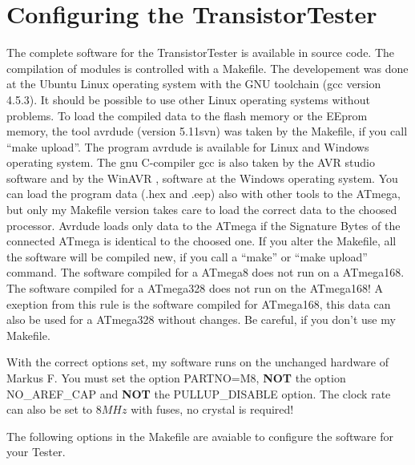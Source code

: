\chapter{Configuring the TransistorTester}
\label{sec:config}
The complete software for the TransistorTester is available in source code.
The compilation of modules is controlled with a Makefile. The developement was done
at the Ubuntu Linux operating system with the GNU toolchain (gcc version 4.5.3).
It should be possible to use other Linux operating systems without problems.
To load the compiled data to the flash memory or
the EEprom memory, the tool avrdude (version 5.11svn) was taken by the Makefile, if you call ``make upload''.
 The program avrdude \cite{avrdude} is available for Linux and Windows operating system.
The gnu C-compiler gcc is also taken by the AVR studio software and
by the WinAVR \cite{winavr1},\cite{winavr2} software at the Windows operating system.
You can load the program data (.hex and .eep) also with other tools to the ATmega,
but only my Makefile version takes care to load the correct data to the choosed processor.
Avrdude loads only data to the ATmega if the Signature Bytes of the connected ATmega is
identical to the choosed one. 
If you alter the Makefile, all the software will be compiled new, if you call a ``make'' or
``make upload'' command. The software compiled for a ATmega8 does not run on a ATmega168.
The software compiled for a ATmega328 does not run on the ATmega168! 
A exeption from this rule is the software compiled for ATmega168, this data can also be used
for a ATmega328 without changes.
Be careful, if you don't use my Makefile.

With the correct options set, my software runs on the unchanged hardware of Markus F.
You must set the option PARTNO=M8, {\bf NOT} the option NO\_AREF\_CAP and {\bf NOT} the  PULLUP\_DISABLE option.
The clock rate can also be set to \(8MHz\) with fuses, no crystal is required!


The following options in the Makefile are avaiable to configure the software for your Tester.


